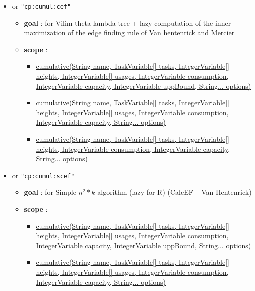\begin{itemize}
\begin{itemize}
\begin{itemize}
					\end{itemize}
		\end{itemize}
		\item \label{ccumulativecef:ccumulativecefoptions}\hypertarget{ccumulativecef:ccumulativecefoptions}{}		
		 or \texttt{"cp:cumul:cef"}
		\begin{itemize}
				\item \textbf{goal} : for Vilim theta lambda tree + lazy computation of the inner maximization of the edge finding rule of Van hentenrick and Mercier
				\item \textbf{scope} : 
					\begin{itemize}
						\item \hyperlink{cumulative:cumulativeconstraint}{cumulative(String name, TaskVariable[] tasks, IntegerVariable[] heights, IntegerVariable[] usages, IntegerVariable consumption, IntegerVariable capacity, IntegerVariable uppBound, String... options)}
						\item \hyperlink{cumulative:cumulativeconstraint}{cumulative(String name, TaskVariable[] tasks, IntegerVariable[] heights, IntegerVariable[] usages, IntegerVariable consumption, IntegerVariable capacity, String... options) }
						\item \hyperlink{cumulative:cumulativeconstraint}{cumulative(String name, TaskVariable[] tasks, IntegerVariable[] heights, IntegerVariable consumption, IntegerVariable capacity, String... options)}
					\end{itemize}
		\end{itemize}
		\item \label{ccumulativescef:ccumulativescefoptions}\hypertarget{ccumulativescef:ccumulativescefoptions}{}		
		 or \texttt{"cp:cumul:scef"}
		\begin{itemize}
				\item \textbf{goal} : for Simple $n^2 * k$ algorithm (lazy for R) (CalcEF -- Van Hentenrick)
				\item \textbf{scope} : 
					\begin{itemize}
						\item \hyperlink{cumulative:cumulativeconstraint}{cumulative(String name, TaskVariable[] tasks, IntegerVariable[] heights, IntegerVariable[] usages, IntegerVariable consumption, IntegerVariable capacity, IntegerVariable uppBound, String... options)}
						\item \hyperlink{cumulative:cumulativeconstraint}{cumulative(String name, TaskVariable[] tasks, IntegerVariable[] heights, IntegerVariable[] usages, IntegerVariable consumption, IntegerVariable capacity, String... options) }

\end{itemize}
\end{itemize}
\end{itemize}
